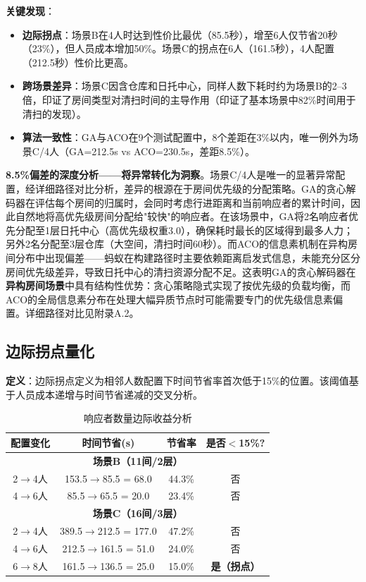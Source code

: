 \documentclass[12pt,a4paper]{ctexart}
\begin{document}
\textbf{关键发现}：
\begin{itemize}
    \item \textbf{边际拐点}：场景B在4人时达到性价比最优（85.5秒），增至6人仅节省20秒（23\%），但人员成本增加50\%。场景C的拐点在6人（161.5秒），4人配置（212.5秒）性价比更高。
    \item \textbf{跨场景差异}：场景C因含仓库和日托中心，同样人数下耗时约为场景B的2--3倍，印证了房间类型对清扫时间的主导作用（印证了基本场景中82\%时间用于清扫的发现）。
    \item \textbf{算法一致性}：GA与ACO在9个测试配置中，8个差距在3\%以内，唯一例外为场景C/4人（GA=212.5s vs ACO=230.5s，差距8.5\%）。
\end{itemize}

\textbf{8.5\%偏差的深度分析——将异常转化为洞察}。场景C/4人是唯一的显著异常配置，经详细路径对比分析，差异的根源在于房间优先级的分配策略。GA的贪心解码器在评估每个房间的归属时，会同时考虑行进距离和当前响应者的累计时间，因此自然地将高优先级房间分配给"较快"的响应者。在该场景中，GA将2名响应者优先分配至1层日托中心（高优先级权重3.0），确保耗时最长的区域得到最多人力；另外2名分配至3层仓库（大空间，清扫时间60秒）。而ACO的信息素机制在异构房间分布中出现偏差——蚂蚁在构建路径时主要依赖距离启发式信息，未能充分区分房间优先级差异，导致日托中心的清扫资源分配不足。这表明GA的贪心解码器在\textbf{异构房间场景}中具有结构性优势：贪心策略隐式实现了按优先级的负载均衡，而ACO的全局信息素分布在处理大幅异质节点时可能需要专门的优先级信息素偏置。详细路径对比见附录A.2。

\subsection{边际拐点量化}

\textbf{定义}：边际拐点定义为相邻人数配置下时间节省率首次低于15\%的位置。该阈值基于人员成本递增与时间节省递减的交叉分析。

\begin{table}[htbp]
\centering
\caption{响应者数量边际收益分析}
\label{tab:marginal}
\begin{tabular}{cccc}
\toprule
\textbf{配置变化} & \textbf{时间节省(s)} & \textbf{节省率} & \textbf{是否$<$15\%?} \\
\midrule
\multicolumn{4}{c}{\textbf{场景B（11间/2层）}} \\
\midrule
2$\to$4人 & 153.5$\to$85.5 = 68.0 & 44.3\% & 否 \\
4$\to$6人 & 85.5$\to$65.5 = 20.0 & 23.4\% & 否 \\
\midrule
\multicolumn{4}{c}{\textbf{场景C（16间/3层）}} \\
\midrule
2$\to$4人 & 389.5$\to$212.5 = 177.0 & 47.2\% & 否 \\
4$\to$6人 & 212.5$\to$161.5 = 51.0 & 24.0\% & 否 \\
6$\to$8人 & 161.5$\to$136.5 = 25.0 & 15.0\% & \textbf{是（拐点）} \\
\bottomrule
\end{tabular}
\end{table}
\end{document}
